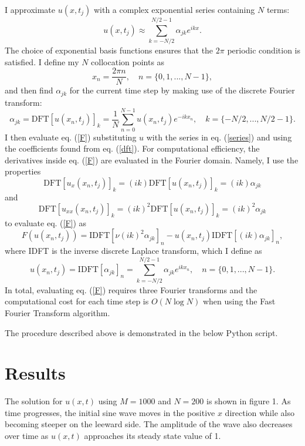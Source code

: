 \documentclass[12pt]{article}
\newcommand{\pythonscript}[2]{\begin{itemize}
                              \item[]
                              \end{itemize}}
\begin{document}
I approximate $u(x,t_j)$ with a complex exponential series containing
$N$ terms:
\begin{equation}\label{series}
  u(x,t_j) \approx \sum_{k=-N/2}^{N/2-1}\alpha_{jk}e^{ikx}.
\end{equation}
The choice of exponential basis functions ensures that the $2\pi$
periodic condition is satisfied.  I define my $N$ collocation points
as
\begin{equation}
  x_n = \frac{2\pi n}{N}, \quad n = \{0,1,...,N-1\},
\end{equation}
and then find $\alpha_{jk}$ for the current time step by making use of the
discrete Fourier transform:
\begin{equation}\label{dft}
  \alpha_{jk} = \mathrm{DFT}[u(x_n,t_j)]_k =
  \frac{1}{N}\sum_{n=0}^{N-1}u(x_n,t_j)e^{-ikx_n}, \quad
  k=\{-N/2,...,N/2-1\}.
\end{equation}  
I then evaluate eq. (\ref{F}) substituting $u$ with the series in
eq. (\ref{series}) and using the coefficients found from
eq. (\ref{dft}). For computational efficiency, the derivatives inside
eq. (\ref{F}) are evaluated in the Fourier domain. Namely, I use the
properties
\begin{equation}
  \mathrm{DFT}[u_{x}(x_n,t_j)]_k = (ik)\mathrm{DFT}[u(x_n,t_j)]_k = (ik)\alpha_{jk}
\end{equation}   
and
\begin{equation}
  \mathrm{DFT}[u_{xx}(x_n,t_j)]_k = (ik)^2\mathrm{DFT}[u(x_n,t_j)]_k = (ik)^2\alpha_{jk}
\end{equation}   
to evaluate eq. (\ref{F}) as
\begin{equation}
  F(u(x_n,t_j)) = \mathrm{IDFT}[\nu(ik)^2\alpha_{jk}]_n -
  u(x_n,t_j)\mathrm{IDFT}[(ik)\alpha_{jk}]_n,
\end{equation}   
where IDFT is the inverse discrete Laplace transform, which I define as
\begin{equation}\label{ift}
  u(x_n,t_j) = \mathrm{IDFT}[\alpha_{jk}]_n =
  \sum_{k=-N/2}^{N/2-1}\alpha_{jk}e^{ikx_n}, \quad
  n=\{0,1,...,N-1\}.
\end{equation}   
In total, evaluating eq. (\ref{F}) requires three Fourier transforms
and the computational cost for each time step is $O(N\log N)$ when
using the Fast Fourier Transform algorithm.  

The procedure described above is demonstrated in the below Python script.

\section*{Results}
The solution for $u(x,t)$ using $M=1000$ and $N=200$ is shown in
figure 1.  As time progresses, the initial sine wave moves in the
positive $x$ direction while also becoming steeper on the leeward
side.  The amplitude of the wave also decreases over time as $u(x,t)$
approaches its steady state value of 1.      
\end{document}
